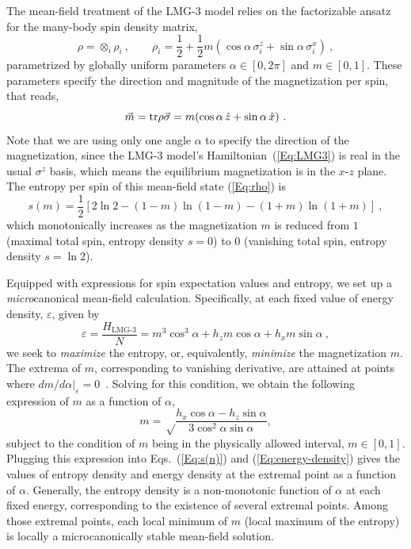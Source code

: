 \documentclass[aps,prx,showpacs,amsmath,amssymb,superscriptaddress,twocolumn,longbibliography,10pt,nofootinbib]{revtex4-2}
\DeclareMathOperator{\tr}{tr}
\begin{document}
The mean-field treatment of the  LMG-3 model relies on the factorizable ansatz for the many-body spin density matrix,
\begin{equation}\label{Eq:rho}
 \rho = \otimes_i \rho_i~,
 \qquad
 \rho_i = \frac12 + \frac12 m (\cos \alpha\, \sigma^z_i+\sin \alpha \, \sigma^x_i)~,
\end{equation}
parametrized by globally uniform parameters $\alpha \in [0,2\pi]$ and $m \in [0,1]$. These parameters specify the direction and magnitude of the magnetization per spin, that reads,
\begin{equation}\label{Eq:m}
 \vec m = {\rm \tr} \rho\vec\sigma = m (\cos \alpha\, \hat z+\sin \alpha\, \hat x)~.
\end{equation}
Note that we are using only one angle $\alpha$ to specify the direction of the magnetization, since the LMG-3 model's Hamiltonian~(\ref{Eq:LMG3}) is real in the usual $\sigma^z$ basis, which means the equilibrium magnetization is in the $x$-$z$ plane. 
The entropy per spin of this mean-field state (\ref{Eq:rho}) is~\cite{Huse14}
\begin{equation}\label{Eq:s(n)}
s(m) = \frac12 [2\ln2-(1-m)\ln(1-m)-(1+m)\ln(1+m)]~,
\end{equation}
which monotonically increases as the magnetization $m$ is reduced from $1$ (maximal total spin, entropy density $s=0$) to $0$ (vanishing total spin, entropy density $s=\ln 2$).

Equipped with expressions for spin expectation values and entropy, we set up a {\it micro}canonical mean-field calculation. Specifically, at each fixed value of energy density, $\varepsilon$, given by 
\begin{equation} \label{Eq:energy-density}
    \varepsilon = \frac{H_\text{LMG-3}}{N} = 
    m^3 \cos^3 \alpha + h_z m \cos\alpha + h_x m \sin\alpha~,
\end{equation}
we seek to \emph{maximize} the entropy, or, equivalently, \emph{minimize} the magnetization $m$. The extrema of $m$, corresponding to vanishing derivative, are attained at points where $dm/d\alpha|_\varepsilon=0$~. Solving for this condition, we obtain the following expression of $m$ as a function of $\alpha$,
\begin{equation}\label{Eq:n-extreme}
 m=\sqrt\frac{  h_x \cos \alpha -h_z  \sin\alpha}{3\cos^2\alpha\sin\alpha}, 
\end{equation} 
subject to the condition of $m$ being in the physically allowed interval, $m \in [0,1]$.  Plugging this expression into Eqs.~(\ref{Eq:s(n)}) and (\ref{Eq:energy-density}) gives the values of entropy density and energy density at the extremal point as a function of $\alpha$. Generally, the entropy density is a non-monotonic function of $\alpha$ at each fixed energy, corresponding to the existence of several extremal points.  Among those extremal points, each local minimum of $m$ (local maximum of the entropy) is locally a microcanonically stable mean-field solution. 
 
\end{document}
